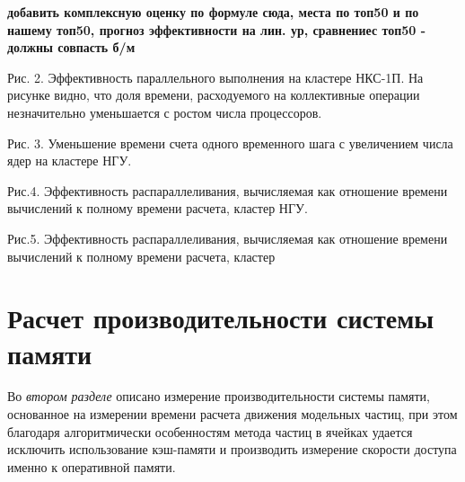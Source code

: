 \textbf{добавить комплексную оценку по формуле сюда, места по топ50 и по нашему топ50, прогноз эффективности на лин. ур, сравнениес топ50 - должны совпасть б/м}

Рис. 2. Эффективность параллельного выполнения на кластере НКС-1П. На рисунке видно, что доля времени, расходуемого на коллективные операции незначительно уменьшается с ростом числа процессоров.


Рис. 3. Уменьшение времени счета одного временного шага с увеличением числа ядер на кластере НГУ.


Рис.4. Эффективность распараллеливания, вычисляемая как отношение времени вычислений к полному времени расчета, кластер НГУ.

Рис.5. Эффективность распараллеливания, вычисляемая как отношение времени вычислений к полному времени расчета, кластер 





\section{Расчет производительности системы памяти}
\label{perfRAM}
Во \textit{втором разделе} описано измерение производительности системы памяти, основанное на измерении времени расчета движения модельных частиц, при этом благодаря алгоритмически особенностям метода частиц в ячейках удается исключить использование кэш-памяти и производить измерение скорости доступа именно к оперативной памяти.

